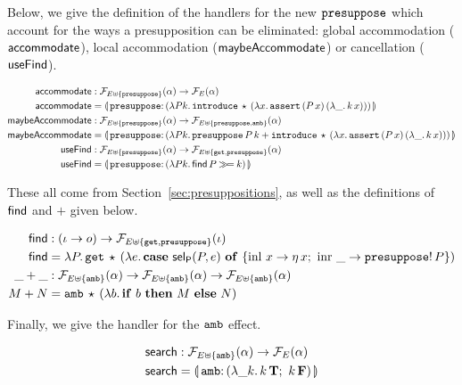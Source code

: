 Below, we give the definition of the handlers for the new $\mathtt{presuppose}$
which account for the ways a presupposition can be eliminated: global
accommodation ($\textsf{accommodate}$), local accommodation ($\textsf{maybeAccommodate}$)
or cancellation ($\textsf{useFind}$).

\begin{align*}
  \accommodate &: \FF_{E \uplus \{\op{presuppose}\}}(\alpha) \to \FF_E(\alpha) \\
  \accommodate &= \banana{\onto{\op{presuppose}}{(\lam{P k}{
    \app{\op{introduce}}{\star}{(\lam{x}{\app{\op{assert}}{(\ap{P}{x})}{(\lam{\_}{\ap{k}{x}})}})}})}} \\
  \maybeAccommodate &: \FF_{E \uplus \{\op{presuppose}\}}(\alpha) \to
                      \FF_{E \uplus \{\op{presuppose},\op{amb}\}}(\alpha) \\
  \maybeAccommodate &= \banana{\onto{\op{presuppose}}{(\lam{P k}{
    \app{\op{presuppose}}{P}{k} +
    \app{\op{introduce}}{\star}{(\lam{x}{\app{\op{assert}}{(\ap{P}{x})}{(\lam{\_}{\ap{k}{x}})}})}})}} \\
  \useFind &: \FF_{E \uplus \{\op{presuppose}\}}(\alpha) \to \FF_{E \uplus \{\op{get}, \op{presuppose}\}}(\alpha) \\
  \useFind &= \banana{\onto{\op{presuppose}}{(\lam{P k}{\ap{\find}{P} \hsbind k})}}
\end{align*}

These all come from Section~\ref{sec:presuppositions}, as well as the
definitions of $\textsf{find}$ and $+$ given below.

\begin{align*}
  \textsf{find} &: (\iota \to o) \to \mathcal{F}_{E \uplus \{\mathtt{get}, \mathtt{presuppose}\}}(\iota) \\
  \textsf{find} &= \lambda P.\, \mathtt{get}\,\star\,(\lambda e.\, \text{\textbf{case} $\textsf{sel}_{\textsf{P}}(P, e)$ \textbf{of} $\{ \operatorname{inl}\,x \to \eta\,x;\ \operatorname{inr}\,\_ \to \mathtt{presuppose}!\,P \}$}) \\
  \_+\_ &: \mathcal{F}_{E \uplus \{\mathtt{amb}\}}(\alpha) \to \mathcal{F}_{E \uplus \{\mathtt{amb}\}}(\alpha) \to \mathcal{F}_{E \uplus \{\mathtt{amb}\}}(\alpha) \\
  M + N &= \mathtt{amb}\,\star\,(\lambda b.\, \text{\textbf{if} $b$ \textbf{then} $M$ \textbf{else} $N$})
\end{align*}

Finally, we give the handler for the $\mathtt{amb}$ effect.

\begin{align*}
  \search &: \FF_{E \uplus \{\op{amb}\}}(\alpha) \to \FF_E(\alpha) \\
  \search &= \banana{\onto{\op{amb}}{(\lam{\_ k}{\ap{k}{\true};\ \ap{k}{\false}})}}
\end{align*}

